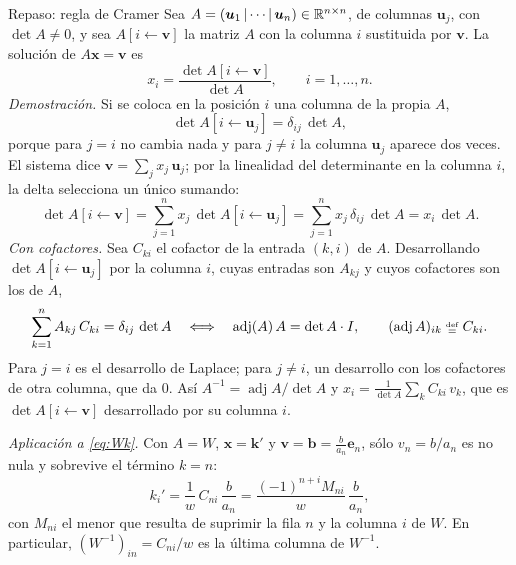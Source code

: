 \documentclass[11pt,twoside]{article}
\newcommand\vk{\bm k}
\newcommand\vb{\bm b}
\newcommand\ve{\bm e}
\begin{document}
\begin{nota}{Repaso: regla de Cramer}
Sea $A=(\bm u_1\,|\cdots|\,\bm u_n)\in\mathbb{R}^{n\times n}$, de columnas $\bm u_j$, con $\det A\neq0$, y sea $A[i\leftarrow\bm v]$
la matriz $A$ con la columna $i$ sustituida por $\bm v$. La solución de $A\bm x=\bm v$ es
\begin{equation*}
x_i=\frac{\det A[i\leftarrow\bm v]}{\det A},\qquad i=1,\dots,n.
\end{equation*}
\emph{Demostración.} Si se coloca en la posición $i$ una columna de la propia $A$,
\begin{equation*}
\det A[i\leftarrow\bm u_j]=\delta_{ij}\,\det A,
\end{equation*}
porque para $j=i$ no cambia nada y para $j\neq i$ la columna $\bm u_j$ aparece dos veces. El sistema dice
$\bm v=\sum_jx_j\,\bm u_j$; por la linealidad del determinante en la columna $i$, la delta selecciona un único sumando:
\begin{equation*}
\det A[i\leftarrow\bm v]=\sum_{j=1}^{n}x_j\,\det A[i\leftarrow\bm u_j]=\sum_{j=1}^{n}x_j\,\delta_{ij}\,\det A=x_i\,\det A.
\end{equation*}
\emph{Con cofactores.} Sea $C_{ki}$ el cofactor de la entrada $(k,i)$ de $A$. Desarrollando $\det A[i\leftarrow\bm u_j]$
por la columna $i$, cuyas entradas son $A_{kj}$ y cuyos cofactores son los de $A$,
\begin{equation*}
\sum_{k=1}^{n}A_{kj}\,C_{ki}=\delta_{ij}\,\det A\quad\Longleftrightarrow\quad\operatorname{adj}(A)\,A=\det A\cdot I,\qquad
(\operatorname{adj}A)_{ik}\defeq C_{ki}.
\end{equation*}
Para $j=i$ es el desarrollo de Laplace; para $j\neq i$, un desarrollo con los cofactores de otra columna, que da $0$. Así
$A^{-1}=\operatorname{adj}A/\det A$ y $x_i=\frac{1}{\det A}\sum_kC_{ki}\,v_k$, que es $\det A[i\leftarrow\bm v]$ desarrollado
por su columna $i$.

\emph{Aplicación a \eqref{eq:Wk}.} Con $A=W$, $\bm x=\vk'$ y $\bm v=\vb=\frac{b}{a_n}\ve_n$, sólo $v_n=b/a_n$ es no nula y
sobrevive el término $k=n$:
\begin{equation*}
k_i'=\frac1w\,C_{ni}\,\frac{b}{a_n}=\frac{(-1)^{n+i}M_{ni}}{w}\,\frac{b}{a_n},
\end{equation*}
con $M_{ni}$ el menor que resulta de suprimir la fila $n$ y la columna $i$ de $W$. En particular, $(W^{-1})_{in}=C_{ni}/w$
es la última columna de $W^{-1}$.
\end{nota}
\end{document}
